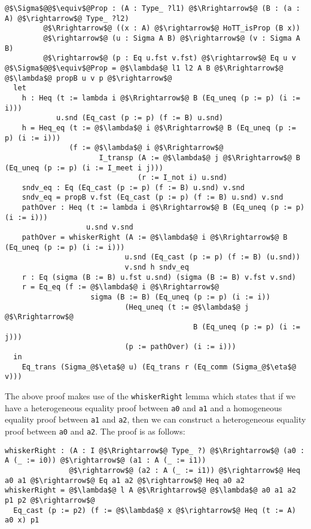 \documentclass[12pt,twoside,maitrise]{dms}
\theoremstyle{definition}
\numberwithin{equation}{section}
\numberwithin{table}{chapter}
\numberwithin{figure}{chapter}
\newcommand\id[1] {\texttt{#1}}
\begin{document}
\begin{verbatim}
@$\Sigma$@@$\equiv$@Prop : (A : Type_ ?l1) @$\Rrightarrow$@ (B : (a : A) @$\rightarrow$@ Type_ ?l2)
         @$\Rrightarrow$@ ((x : A) @$\rightarrow$@ HoTT_isProp (B x))
         @$\rightarrow$@ (u : Sigma A B) @$\rightarrow$@ (v : Sigma A B)
         @$\rightarrow$@ (p : Eq u.fst v.fst) @$\rightarrow$@ Eq u v
@$\Sigma$@@$\equiv$@Prop = @$\lambda$@ l1 l2 A B @$\Rrightarrow$@ @$\lambda$@ propB u v p @$\rightarrow$@
  let
    h : Heq (t := lambda i @$\Rrightarrow$@ B (Eq_uneq (p := p) (i := i)))
            u.snd (Eq_cast (p := p) (f := B) u.snd)
    h = Heq_eq (t := @$\lambda$@ i @$\Rrightarrow$@ B (Eq_uneq (p := p) (i := i)))
               (f := @$\lambda$@ i @$\Rrightarrow$@
                      I_transp (A := @$\lambda$@ j @$\Rrightarrow$@ B (Eq_uneq (p := p) (i := I_meet i j)))
                               (r := I_not i) u.snd)
    sndv_eq : Eq (Eq_cast (p := p) (f := B) u.snd) v.snd
    sndv_eq = propB v.fst (Eq_cast (p := p) (f := B) u.snd) v.snd
    pathOver : Heq (t := lambda i @$\Rrightarrow$@ B (Eq_uneq (p := p) (i := i)))
                   u.snd v.snd
    pathOver = whiskerRight (A := @$\lambda$@ i @$\Rrightarrow$@ B (Eq_uneq (p := p) (i := i)))
                            u.snd (Eq_cast (p := p) (f := B) (u.snd))
                            v.snd h sndv_eq
    r : Eq (sigma (B := B) u.fst u.snd) (sigma (B := B) v.fst v.snd)
    r = Eq_eq (f := @$\lambda$@ i @$\Rrightarrow$@
                    sigma (B := B) (Eq_uneq (p := p) (i := i))
                            (Heq_uneq (t := @$\lambda$@ j @$\Rrightarrow$@
                                            B (Eq_uneq (p := p) (i := j)))
                            (p := pathOver) (i := i)))
  in
    Eq_trans (Sigma_@$\eta$@ u) (Eq_trans r (Eq_comm (Sigma_@$\eta$@ v)))
\end{verbatim}

The above proof makes use of the \id{whiskerRight} lemma which states that if we
have a heterogeneous equality proof between \id{a0} and \id{a1} and a
homogeneous equality proof between \id{a1} and \id{a2}, then we can construct a
heterogeneous equality proof between \id{a0} and \id{a2}. The proof is as
follows:

\begin{verbatim}
whiskerRight : (A : I @$\Rrightarrow$@ Type_ ?) @$\Rrightarrow$@ (a0 : A (_ := i0)) @$\rightarrow$@ (a1 : A (_ := i1))
               @$\rightarrow$@ (a2 : A (_ := i1)) @$\rightarrow$@ Heq a0 a1 @$\rightarrow$@ Eq a1 a2 @$\rightarrow$@ Heq a0 a2
whiskerRight = @$\lambda$@ l A @$\Rrightarrow$@ @$\lambda$@ a0 a1 a2 p1 p2 @$\rightarrow$@
  Eq_cast (p := p2) (f := @$\lambda$@ x @$\rightarrow$@ Heq (t := A) a0 x) p1
\end{verbatim}
\end{document}
